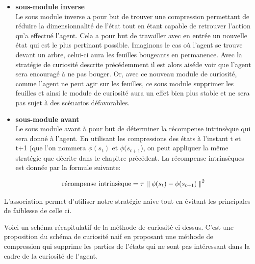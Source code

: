 \begin{itemize}
    \item \textbf{sous-module inverse}\\
        Le sous module inverse a pour but de trouver une compression permettant de réduire la dimensionnalité de l'état tout en étant capable de retrouver l'action qu'a effectué l'agent. Cela a pour but de travailler avec en entrée un nouvelle état qui est le plus pertinant possible. Imaginons le cas où l'agent se trouve devant un arbre, celui-ci aura les feuilles bougeants en permanence. Avec la stratégie de curiosité descrite précédemment il est alors aiséde voir que l'agent sera encouragé à ne pas bouger. Or, avec ce nouveau module de curiosité, comme l'agent ne peut agir sur les feuilles, ce sous module supprimer les feuilles et ainsi le module de curiosité aura un effet bien plus stable et ne sera pas sujet à des scénarios défavorables.
    \item \textbf{sous-module avant}\\
        Le sous module avant à pour but de déterminer la récompense intrinsèque qui sera donné à l'agent.
        En utilisant les compressions des états à l'instant t et t+1 (que l'on nommera $\phi(s_t)$ et $\phi(s_{t+1}$), on peut appliquer la même stratégie que décrite dans le chapitre précédent. La récompense intrinsèques est donnée par la formule suivante:

\begin{equation}\label{eqn:hierarchicalcuriosity}
    \text{récompense intrinsèque} = \tau\: \left\lVert\:  \phi(s_t) - \phi(s_{t+1})  \:\right\rVert^2 
\end{equation}

\end{itemize}

L'association permet d'utiliser notre stratégie naive tout en évitant les principales de faiblesse de celle ci.

Voici un schéma récapitulatif de la méthode de curiosité ci dessus. C'est une proposition du schéma de curiosité naif en proposant une méthode de compression qui supprime les parties de l'états qui ne sont pas intéressant dans la cadre de la curiosité de l'agent.

